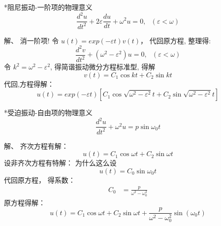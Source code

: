 \begin{frame}
	\begin{exampleblock} {*阻尼振动-一阶项的物理意义}
	\begin{equation*}
		\frac{d^2 u}{d t^2} +2\varepsilon \frac{d u}{dt} +\omega ^2 u = 0 ,  ~~~ (\varepsilon < \omega)   
	\end{equation*}
	\end{exampleblock} 
	\alert{解、} {\color{red}{[X]}} 消一阶项! 令 $\displaystyle  u(t)= exp(-\varepsilon t) v(t) $，  代回原方程, 整理得: 
	\begin{equation*}
		\frac{d^2 v}{d t^2} +(\omega ^2 - \varepsilon ^2) u = 0,  ~~~ (\varepsilon < \omega)   
	\end{equation*}
    令 $k^2 =\omega ^2 - \varepsilon ^2 $, 得简谐振动微分方程标准型, 得解
	\begin{equation*}
		v(t)=C_1 \cos k t +C_2 \sin k t 
	\end{equation*}
	代回,方程得解： 
	\begin{equation*}
		u(t)= exp(-\varepsilon t) [ C_1 \cos \sqrt{\omega ^2 - \varepsilon ^2} t +C_2 \sin \sqrt{\omega ^2 - \varepsilon ^2} t] 
	\end{equation*}	
\end{frame}

\begin{frame}
	\begin{exampleblock} {*受迫振动-自由项的物理意义}
	\begin{equation*}
		\frac{d^2 u}{d t^2} + \omega ^2 u = p  \sin \omega_0 t
	\end{equation*}
	\end{exampleblock}
	\alert{解、} 齐次方程有解：
	\begin{equation*}
		u(t)=C_1 \cos \omega t +C_2 \sin \omega t 
	\end{equation*}
	设非齐次方程有特解：{\color{red}{[?]}} 为什么这么设
	\[  u(t) =C_0 \sin \omega_0 t  \]
	代回原方程， 得系数：
	\begin{align*}
		C_0 & = \frac{p}{\omega^2-\omega_{0} ^2 }
	\end{align*}
	原方程得解： \[ u(t)= C_1 \cos \omega t +C_2 \sin \omega t+ \frac{p}{\omega^2-\omega_{0} ^2 } \sin (\omega_0 t) \] 
\end{frame}

